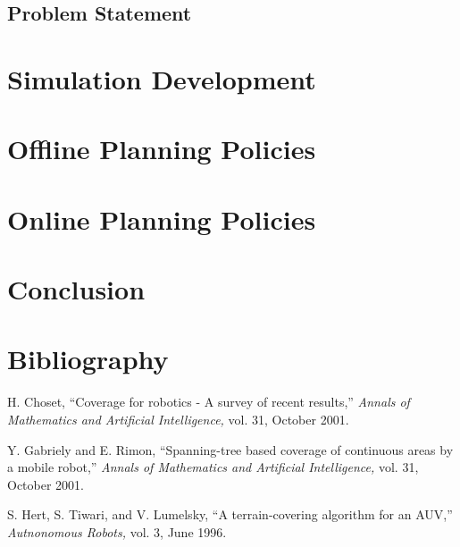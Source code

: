\documentclass[letterpaper, 12pt, leqno]{report}
\begin{document}
\section{Problem Statement}

\chapter{Simulation Development}

\chapter{Offline Planning Policies}

\chapter{Online Planning Policies}

\chapter{Conclusion}

\chapter{Bibliography}


\noindent [1] H. Choset, ``Coverage for robotics - A survey of recent results,'' \textit{Annals of \mbox{Mathematics} and Artificial Intelligence,} vol. 31, October 2001.

\noindent [2] Y. Gabriely and E. Rimon, ``Spanning-tree based coverage of continuous areas by a mobile robot,'' \textit{Annals of \mbox{Mathematics} and Artificial Intelligence,} vol. 31, October 2001.

\noindent [3] S. Hert, S. Tiwari, and V. Lumelsky, ``A terrain-covering algorithm for an AUV,'' \textit{Autnonomous Robots,} vol. 3, June 1996.

\end{document}
